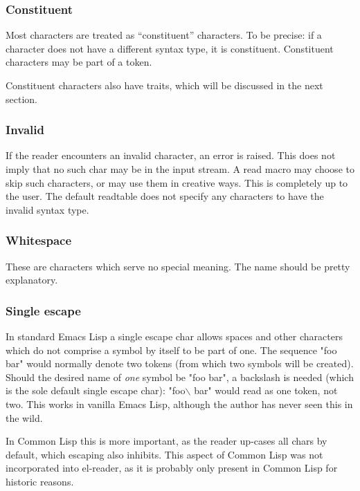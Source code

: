 \documentclass[a4paper]{article}
\newcommand{\el}{Emacs Lisp}
\newcommand{\cl}{Common Lisp}
\newcommand{\elr}{el-reader}
\begin{document}
\subsubsection{Constituent}
\label{par:constituent}

Most characters are treated as ``constituent'' characters.  To be precise: if a
character does not have a different syntax type, it is constituent.  Constituent
characters may be part of a token.

Constituent characters also have traits, which will be discussed in the next
section.
\subsubsection{Invalid}
\label{subsubsection:invalid}

If the reader encounters an invalid character, an error is raised.  This does
not imply that no such char may be in the input stream.  A read macro may choose
to skip such characters, or may use them in creative ways.  This is completely
up to the user.  The default readtable does not specify any characters to have
the invalid syntax type.

\subsubsection{Whitespace}
\label{par:whitespace}

These are characters which serve no special meaning.  The name should be pretty
explanatory.

\subsubsection{Single escape}
\label{par:single-escape}

In standard \el{} a single escape char allows spaces and other characters which
do not comprise a symbol by itself to be part of one.  The sequence "foo bar"
would normally denote two tokens (from which two symbols will be created).
Should the desired name of \emph{one} symbol be "foo bar", a backslash is needed
(which is the sole default single escape char): "foo$\backslash$ bar" would read
as one token, not two.  This works in vanilla \el{}, although the author has
never seen this in the wild.

In \cl{} this is more important, as the reader up-cases all chars by default,
which escaping also inhibits.  This aspect of \cl{} was not incorporated into
\elr{}, as it is probably only present in \cl{} for historic reasons.
\end{document}
